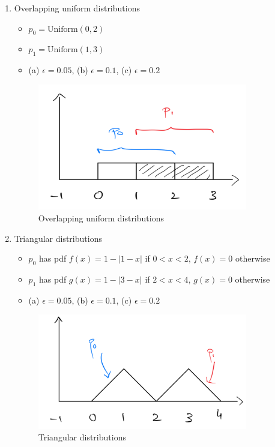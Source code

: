 \documentclass[11pt]{article}
\begin{document}
\begin{enumerate}
\item Overlapping uniform distributions
	\begin{itemize}
		\item $p_0 = \text{Uniform}(0, 2)$
		\item $p_1 = \text{Uniform}(1, 3)$
		\item (a) $\epsilon = 0.05$, (b) $\epsilon = 0.1$, (c) $\epsilon = 0.2$
	\end{itemize}

\begin{center}
	\begin{figure}[h!]
	\includegraphics[width=260pt]{1.png}
	\caption{Overlapping uniform distributions}
	\end{figure}
\end{center}


\item Triangular distributions
	\begin{itemize}
		\item $p_0$ has pdf $f(x) = 1 - |1 - x|$ if $0 < x < 2$, $f(x) = 0$ otherwise
		\item $p_1$ has pdf $g(x) = 1 - |3 - x|$ if $2 < x < 4$, $g(x) = 0$ otherwise
		\item (a) $\epsilon = 0.05$, (b) $\epsilon = 0.1$, (c) $\epsilon = 0.2$
	\end{itemize}

\begin{center}
	\begin{figure}[h!]
	\includegraphics[width=260pt]{2.png}
	\caption{Triangular distributions}
	\end{figure}
\end{center}


\end{enumerate}
\end{document}
